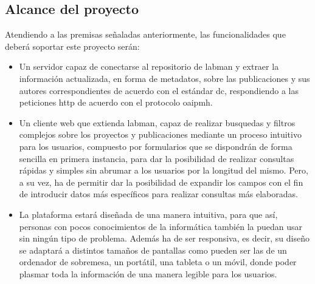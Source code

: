 \subsection{Alcance del proyecto}

Atendiendo a las premisas señaladas anteriormente, las funcionalidades que deberá soportar este proyecto serán:

\begin{itemize}
	\item Un servidor capaz de conectarse al repositorio de \acrshort{labman} y extraer la información actualizada, en forma de metadatos, sobre las publicaciones y sus autores correspondientes de acuerdo con el estándar \acrlong{dc}, respondiendo a las peticiones \acrshort{http} de acuerdo con el protocolo \acrshort{oaipmh}.
	
	\item Un cliente web que extienda \acrshort{labman}, capaz de realizar busquedas y filtros complejos sobre los proyectos y publicaciones mediante un proceso intuitivo para los usuarios, compuesto por formularios que se dispondrán de forma sencilla en primera instancia, para dar la posibilidad de realizar consultas rápidas y simples sin abrumar a los usuarios por la longitud del mismo. Pero, a su vez, ha de permitir dar la posibilidad de expandir los campos con el fin de introducir datos más específicos para realizar consultas más elaboradas.

	\item La plataforma estará diseñada de una manera intuitiva, para que así, personas con pocos conocimientos de la informática también la puedan usar sin ningún tipo de problema. Además ha de ser responsiva, es decir, su diseño se adaptará a distintos tamaños de pantallas como pueden ser las de un ordenador de sobremesa, un portátil, una tableta o un móvil, donde poder plasmar toda la información de una manera legible para los usuarios.
\end{itemize}